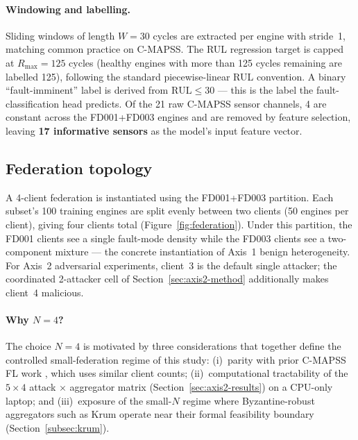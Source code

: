 \documentclass[a4paper,fleqn,doubleblind]{cas-sc}
\begin{document}
\paragraph{Windowing and labelling.}
Sliding windows of length $W = 30$ cycles are extracted per engine
with stride~1, matching common practice on C-MAPSS. The RUL
regression target is capped at $R_{\max} = 125$ cycles (healthy
engines with more than 125 cycles remaining are labelled 125),
following the standard piecewise-linear RUL convention. A binary
``fault-imminent'' label is derived from $\text{RUL} \leq 30$ ---
this is the label the fault-classification head predicts. Of the 21
raw C-MAPSS sensor channels, 4 are constant across the FD001+FD003
engines and are removed by feature selection, leaving
\textbf{17 informative sensors} as the model's input feature vector.

\subsection{Federation topology}
\label{subsec:federation}

A 4-client federation is instantiated using the FD001+FD003
partition. Each subset's 100 training engines are split evenly
between two clients (50 engines per client), giving four clients
total (Figure~\ref{fig:federation}). Under this partition, the
FD001 clients see a single fault-mode density while the FD003
clients see a two-component mixture --- the concrete instantiation
of Axis~1 benign heterogeneity. For Axis~2 adversarial experiments,
client~3 is the default single attacker; the coordinated 2-attacker
cell of Section~\ref{sec:axis2-method} additionally makes client~4
malicious.

\paragraph{Why $N = 4$?}
The choice $N = 4$ is motivated by three considerations that
together define the controlled small-federation regime of this
study: (i)~parity with prior C-MAPSS FL work
\citep{Barbosa2025FLJetEngines, Vermelin2024CollabFLRUL,
Pandhare2021FederatedBaseline}, which uses similar client counts;
(ii)~computational tractability of the $5 \times 4$ attack $\times$
aggregator matrix (Section~\ref{sec:axis2-results}) on a
CPU-only laptop; and (iii)~exposure of the small-$N$ regime where
Byzantine-robust aggregators such as Krum operate near their
formal feasibility boundary (Section~\ref{subsec:krum}).
\end{document}
